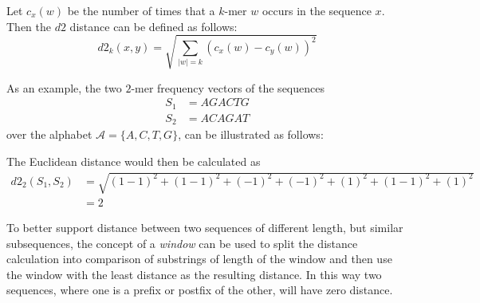 Let $c_x(w)$ be the number of times that a $k$-mer $w$ occurs in the sequence
$x$. Then the $d2$ distance can be defined as follows:
\begin{equation}
  d2_k(x,y) = \sqrt{\sum_{|w|=k} (c_x(w) - c_y(w))^2}
\end{equation}

As an example, the two $2$-mer frequency vectors of the sequences
\begin{align*}
  S_1 &= AGACTG \\
  S_2 &= ACAGAT
\end{align*}
over the alphabet $\mathcal{A} = \{A,C,T,G\}$, can be illustrated as follows:

\begin{table}[!h]
\centering
{}
\end{table}

The Euclidean distance would then be calculated as
\begin{align*}
  d2_2(S_1, S_2)
    &= \sqrt{(1-1)^2 + (1-1)^2 + (-1)^2 + (-1)^2 + (1)^2 + (1-1)^2 + (1)^2} \\
    &= 2
\end{align*}

To better support distance between two sequences of different length, but
similar subsequences, the concept of a \emph{window} can be used to split the
distance calculation into comparison of substrings of length of the window
and then use the window with the least distance as the resulting distance. In
this way two sequences, where one is a prefix or postfix of the other, will
have zero distance.




